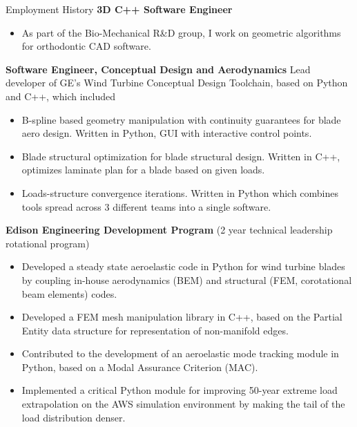 \begin{rubric}{Employment History}
\entry*[2026 -- Present]%
	\textbf{3D C++ Software Engineer}
 \begin{itemize}
     \item As part of the Bio-Mechanical R\&D group, I work on geometric algorithms for orthodontic CAD software.
 \end{itemize}
\entry*[2023 -- 2025]%
	\textbf{Software Engineer, Conceptual Design and Aerodynamics}
    Lead developer of GE's Wind Turbine Conceptual Design Toolchain, based on Python and C++, which included
 \begin{itemize} 
    \item B-spline based geometry manipulation with continuity guarantees for blade aero design. Written in Python, GUI with interactive control points.
    \item Blade structural optimization for blade structural design. Written in C++, optimizes laminate plan for a blade based on given loads.
    \item Loads-structure convergence iterations. Written in Python which combines tools spread across 3 different teams into a single software.
  \end{itemize}
%
%
\entry*[2021 -- 2023]%
	\textbf{Edison Engineering Development Program} (2 year technical leadership rotational program)
 \begin{itemize}
     \item Developed a steady state aeroelastic code in Python for wind turbine blades by coupling in-house aerodynamics (BEM) and structural (FEM, corotational beam elements) codes.
     \item Developed a FEM mesh manipulation library in C++, based on the Partial Entity data structure for representation of non-manifold edges.
     \item Contributed to the development of an aeroelastic mode tracking module in Python, based on a Modal Assurance Criterion (MAC).
     \item Implemented a critical Python module for improving 50-year extreme load extrapolation on the AWS simulation environment by making the tail of the load distribution denser.
\end{itemize}
\end{rubric}